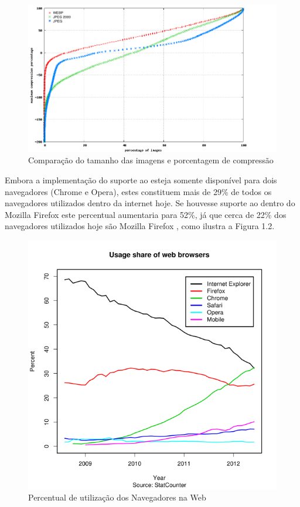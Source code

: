 \documentclass[espaco=simples,appendix=Name]{abnt}
\begin{document}
\begin{figure}[h]
  \centering
    \includegraphics[scale=0.4]{Plot3_cdfcompr.png}
  \caption{Comparação do tamanho das imagens e porcentagem de compressão \protect\cite{WebPStudy}}
\end{figure}

Embora a implementação do suporte ao  esteja somente disponível para dois navegadores (Chrome e Opera), estes constituem mais de 29\% de todos os navegadores utilizados dentro da internet hoje. Se houvesse suporte ao  dentro do Mozilla Firefox este percentual aumentaria para 52\%, já que cerca de 22\% dos navegadores utilizados hoje são Mozilla Firefox \protect\cite{BrowserStats}, como ilustra a Figura 1.2.

\begin{figure}[h]
  \centering
    \includegraphics[scale=0.5]{BrowserCounter.png}
  \caption{Percentual de utilização dos Navegadores na Web \cite{BrowserStats}}
\end{figure}
\end{document}
